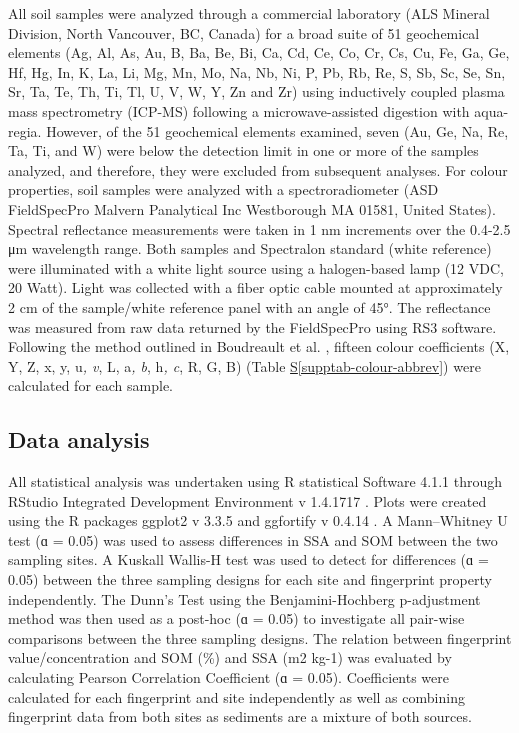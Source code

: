 \documentclass[
  number]{elsarticle}
\newcommand*\quartosupptabref[1]{Table \hyperref[#1]{S\ref{#1}}}
\begin{document}
All soil samples were analyzed through a commercial laboratory (ALS
Mineral Division, North Vancouver, BC, Canada) for a broad suite of 51
geochemical elements (Ag, Al, As, Au, B, Ba, Be, Bi, Ca, Cd, Ce, Co, Cr,
Cs, Cu, Fe, Ga, Ge, Hf, Hg, In, K, La, Li, Mg, Mn, Mo, Na, Nb, Ni, P,
Pb, Rb, Re, S, Sb, Sc, Se, Sn, Sr, Ta, Te, Th, Ti, Tl, U, V, W, Y, Zn
and Zr) using inductively coupled plasma mass spectrometry (ICP-MS)
following a microwave-assisted digestion with aqua-regia. However, of
the 51 geochemical elements examined, seven (Au, Ge, Na, Re, Ta, Ti, and
W) were below the detection limit in one or more of the samples
analyzed, and therefore, they were excluded from subsequent analyses.
For colour properties, soil samples were analyzed with a
spectroradiometer (ASD FieldSpecPro Malvern Panalytical Inc Westborough
MA 01581, United States). Spectral reflectance measurements were taken
in 1 nm increments over the 0.4-2.5 μm wavelength range. Both samples
and Spectralon standard (white reference) were illuminated with a white
light source using a halogen-based lamp (12 VDC, 20 Watt). Light was
collected with a fiber optic cable mounted at approximately 2 cm of the
sample/white reference panel with an angle of 45°. The reflectance was
measured from raw data returned by the FieldSpecPro using RS3 software.
Following the method outlined in Boudreault et al.
\citep{boudreault2018}, fifteen colour coefficients (X, Y, Z, x, y,
u\emph{, v}, L, a\emph{, b}, h\emph{, c}, R, G, B)
(\quartosupptabref{supptab-colour-abbrev}) were calculated for each
sample.

\subsection{Data analysis}\label{data-analysis}

All statistical analysis was undertaken using R statistical Software
4.1.1 \citep{rcoreteam2021} through RStudio Integrated Development
Environment v 1.4.1717 \citep{rstudio2021}. Plots were created using the
R packages ggplot2 v 3.3.5 \citep{wickham2016} and ggfortify v 0.4.14
\citep{tang2016}. A Mann--Whitney U test (ɑ = 0.05) was used to assess
differences in SSA and SOM between the two sampling sites. A Kuskall
Wallis-H test was used to detect for differences (ɑ = 0.05) between the
three sampling designs for each site and fingerprint property
independently. The Dunn's Test \citep[FSA v 0.9.5][]{ogle2023} using the
Benjamini-Hochberg p-adjustment method was then used as a post-hoc (ɑ =
0.05) to investigate all pair-wise comparisons between the three
sampling designs. The relation between fingerprint value/concentration
and SOM (\%) and SSA (m2 kg-1) was evaluated by calculating Pearson
Correlation Coefficient (ɑ = 0.05). Coefficients were calculated for
each fingerprint and site independently as well as combining fingerprint
data from both sites as sediments are a mixture of both sources.
\end{document}

